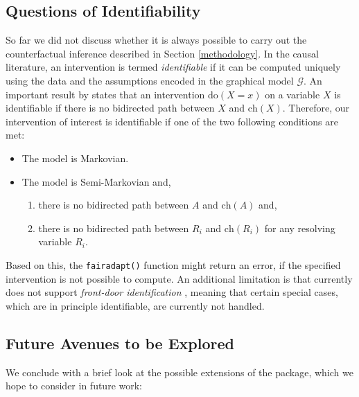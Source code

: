 \documentclass[
  nojss]{jss}
\providecommand{\tightlist}{%
  \setlength{\itemsep}{0pt}\setlength{\parskip}{0pt}}
\begin{document}
\hypertarget{questions-of-identifiability}{%
\subsection{Questions of
Identifiability}\label{questions-of-identifiability}}

So far we did not discuss whether it is always possible to carry out the
counterfactual inference described in Section \ref{methodology}. In the
causal literature, an intervention is termed \emph{identifiable} if it
can be computed uniquely using the data and the assumptions encoded in
the graphical model \(\mathcal{G}\). An important result by
\cite{tian2002general} states that an intervention do\((X = x)\) on a
variable \(X\) is identifiable if there is no bidirected path between
\(X\) and \(\mathrm{ch}(X)\). Therefore, our intervention of interest is
identifiable if one of the two following conditions are met:

\begin{itemize}
\tightlist
\item
  The model is Markovian.
\item
  The model is Semi-Markovian and,

  \begin{enumerate}
  \def\labelenumi{(\roman{enumi})}
  \tightlist
  \item
    there is no bidirected path between \(A\) and \(\mathrm{ch}(A)\)
    and,
  \item
    there is no bidirected path between \(R_i\) and \(\mathrm{ch}(R_i)\)
    for any resolving variable \(R_i\).
  \end{enumerate}
\end{itemize}

Based on this, the \texttt{fairadapt()} function might return an error,
if the specified intervention is not possible to compute. An additional
limitation is that  currently does not support
\emph{front-door identification} \citep[Chapter~3]{pearl2009causality},
meaning that certain special cases, which are in principle identifiable,
are currently not handled.

\hypertarget{future-avenues-to-be-explored}{%
\subsection{Future Avenues to be
Explored}\label{future-avenues-to-be-explored}}

We conclude with a brief look at the possible extensions of the
 package, which we hope to consider in future work:
\end{document}
